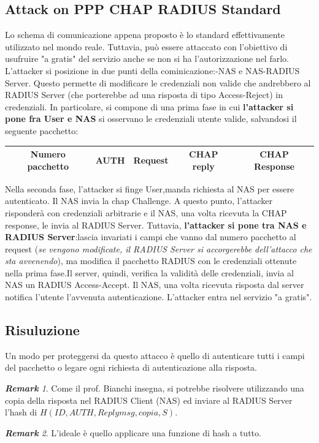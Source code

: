 \documentclass{book}
\theoremstyle{remark}
\newtheorem*{remark}{\textbf{Remark}}
\begin{document}
\subsection{Attack on PPP CHAP RADIUS Standard}
Lo schema di comunicazione appena proposto è lo standard effettivamente utilizzato nel mondo reale\@. Tuttavia, può essere attaccato con l'obiettivo di usufruire "a gratis" del servizio anche se non si ha l'autorizzazione nel farlo\@.\newline
L'attacker si posizione in due punti della cominicazione:\@User-NAS e NAS-RADIUS Server\@. Questo permette di modificare le credenziali non valide che andrebbero al RADIUS Server (che porterebbe ad una risposta di tipo Access-Reject) in credenziali\@.\newline
In particolare, si compone di una prima fase in cui \textbf{l'attacker si pone fra User e NAS} si osservano le credenziali utente valide, salvandosi il seguente pacchetto:
\begin{center}
	\begin{tabular}{ |c|c|c|c|c| }
		\hline
		Numero pacchetto & AUTH & Request & CHAP reply & CHAP Response \\
		\hline
	\end{tabular}
\end{center}
Nella seconda fase, l'attacker si finge User,manda richiesta al NAS per essere autenticato\@. Il NAS invia la chap Challenge\@. A questo punto, l'attacker risponderà con credenziali arbitrarie e il NAS, una volta ricevuta la CHAP response, le invia al RADIUS Server\@. Tuttavia, \textbf{l'attacker si pone tra NAS e RADIUS Server}:lascia invariati i campi che vanno dal numero pacchetto al request (\emph{se vengono modificate, il RADIUS Server si accorgerebbe dell'attacco che sta avvenendo}), ma modifica il pacchetto RADIUS con le credenziali ottenute nella prima fase\@.Il server, quindi, verifica la validità delle credenziali, invia al NAS un RADIUS Access-Accept\@. Il NAS, una volta ricevuta risposta dal server notifica l'utente l'avvenuta autenticazione\@.\newline
L'attacker entra nel servizio "a gratis"\@.
\subsection{Risuluzione}
Un modo per proteggersi da questo attacco è quello di autenticare tutti i campi del pacchetto o legare ogni richiesta di autenticazione alla risposta\@.
\begin{remark}
	Come il prof\@. Bianchi insegna, si potrebbe risolvere utilizzando una copia della risposta nel RADIUS Client (NAS) ed inviare al RADIUS Server l'hash di \(H (ID,AUTH,Replymsg,copia,S)\)\@.
\end{remark}
\begin{remark}
	L'ideale è quello applicare una funzione di hash a tutto\@.
\end{remark}
\end{document}
